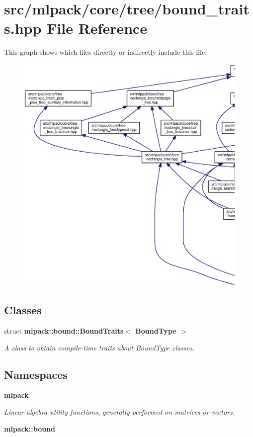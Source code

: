 \section{src/mlpack/core/tree/bound\+\_\+traits.hpp File Reference}
\label{bound__traits_8hpp}
This graph shows which files directly or indirectly include this file\+:
\nopagebreak
\begin{figure}[H]
\begin{center}
\leavevmode
\includegraphics[width=350pt]{bound__traits_8hpp__dep__incl}
\end{center}
\end{figure}
\subsection*{Classes}
\begin{DoxyCompactItemize}
\item 
struct {\bf mlpack\+::bound\+::\+Bound\+Traits$<$ Bound\+Type $>$}
\begin{DoxyCompactList}\small\item\em A class to obtain compile-\/time traits about Bound\+Type classes. \end{DoxyCompactList}\end{DoxyCompactItemize}
\subsection*{Namespaces}
\begin{DoxyCompactItemize}
\item 
 {\bf mlpack}
\begin{DoxyCompactList}\small\item\em Linear algebra utility functions, generally performed on matrices or vectors. \end{DoxyCompactList}\item 
 {\bf mlpack\+::bound}
\end{DoxyCompactItemize}


